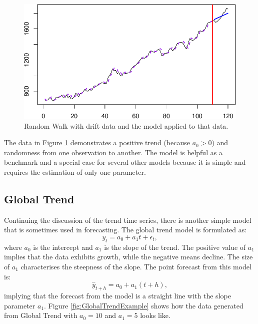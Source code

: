 \documentclass[
]{book}
\theoremstyle{definition}
\theoremstyle{definition}
\theoremstyle{definition}
\theoremstyle{definition}
\theoremstyle{remark}
\begin{document}
\begin{figure}
\centering
\includegraphics{Svetunkov--2022----ADAM_files/figure-latex/RWDriftExample-1.pdf}
\caption{\label{fig:RWDriftExample}Random Walk with drift data and the model applied to that data.}
\end{figure}

The data in Figure \ref{fig:RWDriftExample} demonstrates a positive trend (because \(a_0>0\)) and randomness from one observation to another. The model is helpful as a benchmark and a special case for several other models because it is simple and requires the estimation of only one parameter.

\hypertarget{GlobalTrend}{%
\subsection{Global Trend}\label{GlobalTrend}}

Continuing the discussion of the trend time series, there is another simple model that is sometimes used in forecasting. The global trend model is formulated as:
\begin{equation}
    y_t = a_0 + a_1 t + \epsilon_t,
    \label{eq:GlobalTrend}
\end{equation}
where \(a_0\) is the intercept and \(a_1\) is the slope of the trend. The positive value of \(a_1\) implies that the data exhibits growth, while the negative means decline. The size of \(a_1\) characterises the steepness of the slope. The point forecast from this model is:
\begin{equation}
    \hat{y}_{t+h} = a_0 + a_1 (t+h),
    \label{eq:GlobalTrendForecast}
\end{equation}
implying that the forecast from the model is a straight line with the slope parameter \(a_1\). Figure \ref{fig:GlobalTrendExample} shows how the data generated from Global Trend with \(a_0=10\) and \(a_1=5\) looks like.
\end{document}
